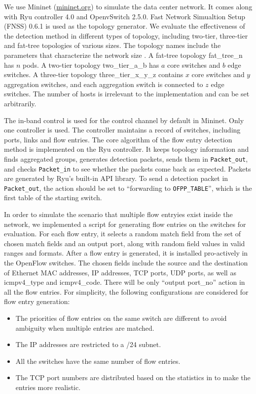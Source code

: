 \documentclass[conference]{IEEEtran}
\begin{document}
We use Mininet (\url{mininet.org}) to simulate the data center network. It comes along with Ryu controller 4.0 and OpenvSwitch 2.5.0. Fast Network Simualtion Setup (FNSS) 0.6.1 is used as the topology generator. We evaluate the effectiveness of the detection method in different types of topology, including two-tier, three-tier and fat-tree topologies of various sizes. The topology names include the parameters that characterize the network size \cite{FNSS}. A fat-tree topology fat\_tree\_n has $n$ pods. A two-tier topology two\_tier\_a\_b has $a$ core switches and $b$ edge switches. A three-tier topology three\_tier\_x\_y\_z contains $x$ core switches and $y$ aggregation switches, and each aggregation switch is connected to $z$ edge switches. The number of hosts is irrelevant to the implementation and can be set arbitrarily.

The in-band control is used for the control channel by default in Mininet. Only one controller is used. The controller maintains a record of switches, including ports, links and flow entries. The core algorithm of the flow entry detection method is implemented on the Ryu controller. It keeps topology information and finds aggregated groups, generates detection packets, sends them in \texttt{Packet\_out}, and checks \texttt{Packet\_in} to see whether the packets come back as expected. Packets are generated by Ryu's built-in API library. To send a detection packet in \texttt{Packet\_out}, the action should be set to ``forwarding to \texttt{OFPP\_TABLE}'', which is the first table of the starting switch.

In order to simulate the scenario that multiple flow entryies exist inside the network, we implemented a script for generating flow entries on the switches for evaluation. For each flow entry, it selects a random match field from the set of chosen match fields and an output port, along with random field values in valid ranges and formats. After a flow entry is generated, it is installed pro-actively in the OpenFlow switches. The chosen fields include the source and the destination of Ethernet MAC addresses, IP addresses, TCP ports, UDP ports, as well as icmpv4\_type and icmpv4\_code. There will be only ``output port\_no'' action in all the flow entries. For simplicity, the following configurations are considered for flow entry generation:

\begin{itemize}
\item
The priorities of flow entries on the same switch are different to avoid ambiguity when multiple entries are matched.
\item
The IP addresses are restricted to a /24 subnet.
\item
All the switches have the same number of flow entries. 
\item
The TCP port numbers are distributed based on the statistics in \cite{BREAKDOWN} to make the entries more realistic.
\end{itemize}
\end{document}
